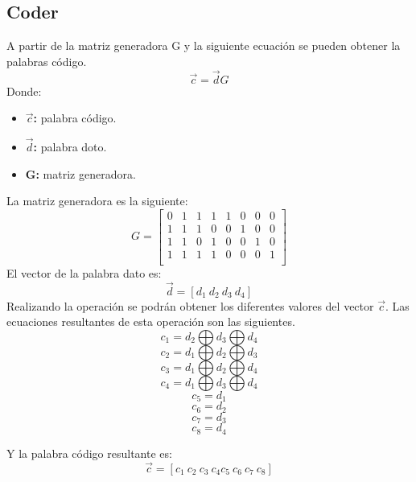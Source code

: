\documentclass[12pt,letterpaper]{article}
\begin{document}
\subsection{Coder}
A partir de la matriz generadora G y la siguiente ecuación se pueden obtener la palabras código.
\begin{equation}
    \vec{c}=\vec{d}G
\end{equation}
Donde:
\begin{itemize}
    \item \textbf{$\vec{c}$: } palabra código.
    \item \textbf{$\vec{d}$: } palabra doto.
    \item \textbf{G: } matriz generadora.
\end{itemize}
La matriz generadora es la siguiente:
\[
G
=
\begin{bmatrix} 
    0 & 1 & 1 & 1 & 1 & 0 & 0 & 0 \\
    1 & 1 & 1 & 0 & 0 & 1 & 0 & 0 \\
    1 & 1 & 0 & 1 & 0 & 0 & 1 & 0 \\
    1 & 1 & 1 & 1 & 0 & 0 & 0 & 1 \\
    \end{bmatrix}
\]
El vector de la palabra dato es:
\begin{equation}
    \vec{d}=[d_1 \ d_2 \ d_3 \ d_4]
\end{equation}
Realizando la operación se podrán obtener los diferentes valores del vector $\vec{c}$.
Las ecuaciones resultantes de esta operación son las siguientes.
$$c_1=d_2 \bigoplus d_3 \bigoplus d_4$$
$$c_2=d_1 \bigoplus d_2 \bigoplus d_3$$
$$c_3=d_1 \bigoplus d_2 \bigoplus d_4$$
$$c_4=d_1 \bigoplus d_3 \bigoplus d_4$$
$$c_5=d_1$$
$$c_6=d_2$$
$$c_7=d_3$$
$$c_8=d_4$$

Y la palabra código resultante es:
\begin{equation}
    \vec{c}=[c_1 \ c_2 \ c_3 \ c_4 c_5 \ c_6 \ c_7 \ c_8]
\end{equation}

\newpage
\end{document}
